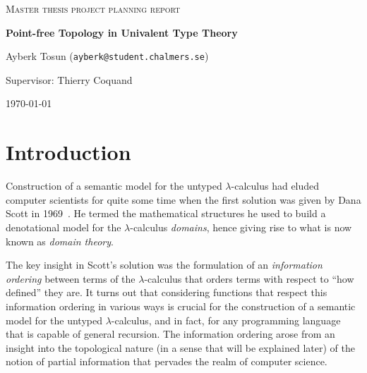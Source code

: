 \documentclass{article}
\begin{document}
\begin{titlepage}

\centering
  
{\scshape\LARGE Master thesis project planning report\\}
  
\vspace{0.5cm}
  
{\huge\bfseries Point-free Topology in Univalent Type Theory\\}
  
\vspace{2cm}

{\Large Ayberk Tosun (\texttt{ayberk@student.chalmers.se})\\}
  
\vspace{1.0cm}
  
{\large Supervisor: Thierry Coquand\\}

\vspace{1.5cm}

\vfill

\vfill
  
{\large \today\\} 

\end{titlepage}

\section{Introduction}

Construction of a semantic model for the untyped $\lambda$-calculus had eluded computer
scientists for quite some time when the first solution was given by Dana Scott in
1969~\cite{scott:1969}. He termed the mathematical structures he used to build a
denotational model for the $\lambda$-calculus \emph{domains}, hence giving rise to what is now
known as \emph{domain theory}.

The key insight in Scott's solution was the formulation of an \emph{information ordering}
between terms of the $\lambda$-calculus that orders terms with respect to ``how defined'' they
are. It turns out that considering functions that respect this information ordering in
various ways is crucial for the construction of a semantic model for the untyped
$\lambda$-calculus, and in fact, for any programming language that is capable of general
recursion. The information ordering arose from an insight into the topological nature (in
a sense that will be explained later) of the notion of partial information that pervades
the realm of computer science.
\end{document}
